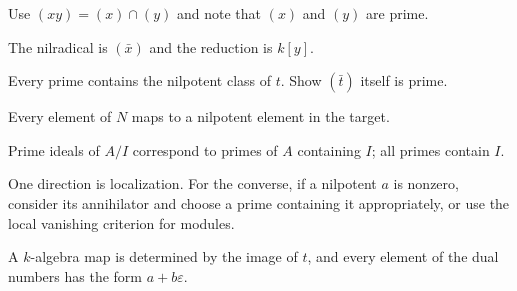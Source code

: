 \begin{hint}
Use $(xy)=(x)\cap(y)$ and note that $(x)$ and $(y)$ are prime.
\end{hint}
\begin{hint}
The nilradical is $(\bar x)$ and the reduction is $k[y]$.
\end{hint}
\begin{hint}
Every prime contains the nilpotent class of $t$.  Show $(\bar t)$ itself is prime.
\end{hint}
\begin{hint}
Every element of $N$ maps to a nilpotent element in the target.
\end{hint}
\begin{hint}
Prime ideals of $A/I$ correspond to primes of $A$ containing $I$; all primes contain $I$.
\end{hint}
\begin{hint}
One direction is localization.  For the converse, if a nilpotent $a$ is nonzero, consider its
annihilator and choose a prime containing it appropriately, or use the local vanishing
criterion for modules.
\end{hint}
\begin{hint}
A $k$-algebra map is determined by the image of $t$, and every element of the dual numbers
has the form $a+b\varepsilon$.
\end{hint}
